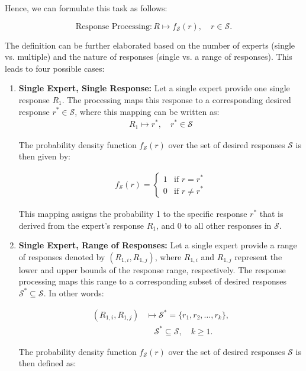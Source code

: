 \begin{enumerate}
\begin{definition}
Hence, we can formulate this task as follows:

\[
\text{Response Processing}: R \mapsto f_{\mathcal{S}}(r), \quad r \in \mathcal{S}.
\]

The definition can be further elaborated based on the number of experts (single vs. multiple) and the nature of responses (single  vs. a range of responses). This leads to four possible cases:

\begin{enumerate}
    \item \textbf{Single Expert, Single Response:} Let a single expert provide one single response $R_1$. The  processing maps this response to a corresponding desired response $r^* \in \mathcal{S}$, where this mapping can be written as:
\begin{align*}
    R_1 \mapsto r^*, \quad r^* \in \mathcal{S}
\end{align*}


The probability density function $f_{\mathcal{S}}(r)$ over the set of desired responses $\mathcal{S}$ is then given by:

\begin{align*}
f_{\mathcal{S}}(r) =
\begin{cases}
1 & \text{if } r = r^* \\
0 & \text{if } r \neq r^*
\end{cases}
\end{align*}


This mapping assigns the probability 1 to the specific response $r^*$ that is derived from the expert's response $R_1$, and 0 to all other responses in $\mathcal{S}$.


    \item \textbf{Single Expert, Range of Responses:} Let a single expert provide a range of responses denoted by $(R_{1,i}, R_{1,j})$, where $R_{1,i}$ and $R_{1,j}$ represent the lower and upper bounds of the response range, respectively. The response processing maps this range to a corresponding subset of desired responses $\mathcal{S}^* \subseteq \mathcal{S}$. In other words:

\begin{align*}
(R_{1,i}, R_{1,j}) & \mapsto \mathcal{S}^* = \{r_1, r_2, \ldots, r_k\}, \\
& \quad \mathcal{S}^* \subseteq \mathcal{S}, \quad k \geq 1.
\end{align*}


The probability density function $f_{\mathcal{S}}(r)$ over the set of desired responses $\mathcal{S}$ is then defined as:


\end{enumerate}
\end{definition}
\end{enumerate}
